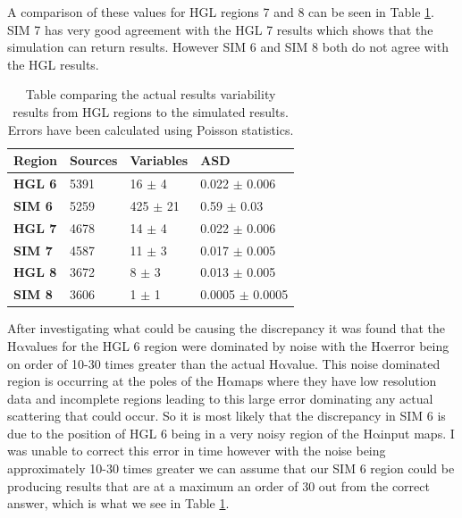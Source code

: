 \documentclass[a4paper, 10pt]{article}
\def\halpha{$\mathrm{H\alpha}$\;}
\begin{document}
A comparison of these values for HGL regions 7 and 8 can be seen in Table \ref{tab:HGLcomp}. SIM 7 has very good agreement with the HGL 7 results which shows that the simulation can return results. However SIM 6 and SIM 8 both do not agree with the HGL results. 
\begin{table}[H]
    \centering
\begin{tabular}{llll}
    \toprule
    \textbf{Region}	& \textbf{Sources}	&	\textbf{Variables}	&		\textbf{ASD}		\\ \midrule
    \textbf{HGL 6}	&   5391 &	16 $\pm$ 4  &	0.022 $\pm$ 0.006	\\
    \textbf{SIM 6}	&	5259 &  425 $\pm$ 21&	0.59  $\pm$ 0.03	\\\midrule
    \textbf{HGL 7}	&	4678 &	14 $\pm$ 4	&	0.022 $\pm$ 0.006	\\
    \textbf{SIM 7}	&	4587 &	11 $\pm$ 3	&	0.017 $\pm$ 0.005	\\\midrule
    \textbf{HGL 8}	&	3672 &	8 $\pm$ 3 	&	0.013 $\pm$ 0.005	\\
    \textbf{SIM 8}	&   3606 &	1 $\pm$ 1	&	0.0005 $\pm$ 0.0005	\\\bottomrule
\end{tabular}
    \caption{Table comparing the actual results variability results from HGL regions to the simulated results. Errors have been calculated using Poisson statistics.}
    \label{tab:HGLcomp}
\end{table}

After investigating what could be causing the discrepancy it was found that the \halpha values for the HGL 6 region were dominated by noise with the \halpha error being on order of 10-30 times greater than the actual \halpha value. This noise dominated region is occurring at the poles of the \halpha maps where they have low resolution data and incomplete regions leading to this large error dominating any actual scattering that could occur. So it is most likely that the discrepancy in SIM 6 is due to the position of HGL 6 being in a very noisy region of the \halpha input maps. I was unable to correct this error in time however with the noise being approximately 10-30 times greater we can assume that our SIM 6 region could be producing results that are at a maximum  an order of 30 out from the correct answer, which is what we see in Table \ref{tab:HGLcomp}.\\
\end{document}
